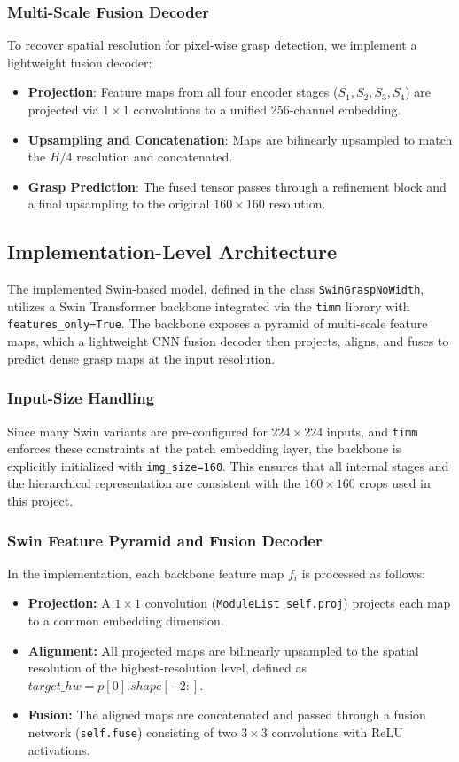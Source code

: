 \subsubsection{Multi-Scale Fusion Decoder}
To recover spatial resolution for pixel-wise grasp detection, we implement a lightweight fusion decoder:
\begin{itemize}
    \item \textbf{Projection}: Feature maps from all four encoder stages ($S_1, S_2, S_3, S_4$) are projected via $1 \times 1$ convolutions to a unified 256-channel embedding.
    \item \textbf{Upsampling and Concatenation}: Maps are bilinearly upsampled to match the $H/4$ resolution and concatenated.
    \item \textbf{Grasp Prediction}: The fused tensor passes through a refinement block and a final upsampling to the original $160 \times 160$ resolution.
\end{itemize}

\subsection{Implementation-Level Architecture}

The implemented Swin-based model, defined in the class \texttt{SwinGraspNoWidth}, utilizes a Swin Transformer backbone integrated via the \texttt{timm} library with \texttt{features\_only=True}. The backbone exposes a pyramid of multi-scale feature maps, which a lightweight CNN fusion decoder then projects, aligns, and fuses to predict dense grasp maps at the input resolution.

\subsubsection{Input-Size Handling}
Since many Swin variants are pre-configured for $224 \times 224$ inputs, and \texttt{timm} enforces these constraints at the patch embedding layer, the backbone is explicitly initialized with \texttt{img\_size=160}. This ensures that all internal stages and the hierarchical representation are consistent with the $160 \times 160$ crops used in this project.

\subsubsection{Swin Feature Pyramid and Fusion Decoder}
In the implementation, each backbone feature map $f_i$ is processed as follows:
\begin{itemize}
    \item \textbf{Projection:} A $1 \times 1$ convolution (\texttt{ModuleList self.proj}) projects each map to a common embedding dimension.
    \item \textbf{Alignment:} All projected maps are bilinearly upsampled to the spatial resolution of the highest-resolution level, defined as $target\_hw = p[0].shape[-2:]$.
    \item \textbf{Fusion:} The aligned maps are concatenated and passed through a fusion network (\texttt{self.fuse}) consisting of two $3 \times 3$ convolutions with ReLU activations.
\end{itemize}

